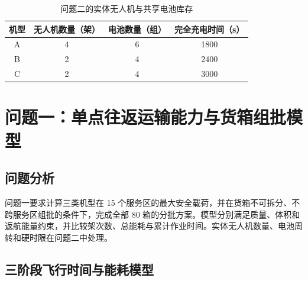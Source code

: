 \documentclass[bwprint,fontset=windows]{gmcmthesis}
\begin{document}
\begin{table}[!htbp]
\centering
\caption{问题二的实体无人机与共享电池库存}
\label{tab:q2-resources}
\small
\begin{tabular}{@{}cccc@{}}
\toprule
机型 & 无人机数量（架） & 电池数量（组） & 完全充电时间（s） \\
\midrule
A & 4 & 6 & 1800 \\
B & 2 & 4 & 2400 \\
C & 2 & 4 & 3000 \\
\bottomrule
\end{tabular}
\end{table}

\vspace{\baselineskip}
\section{问题一：单点往返运输能力与货箱组批模型}

\subsection{问题分析}

问题一要求计算三类机型在 15 个服务区的最大安全载荷，并在货箱不可拆分、不跨服务区组批的条件下，完成全部 80 箱的分批方案。模型分别满足质量、体积和返航能量约束，并比较架次数、总能耗与累计作业时间。实体无人机数量、电池周转和硬时限在问题二中处理。

\subsection{三阶段飞行时间与能耗模型}
\end{document}
